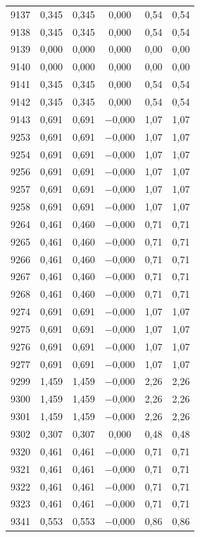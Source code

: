 \begin{longtable}{lccccc}
9137 & 0,345 & 0,345 & 0,000 & 0,54 & 0,54 \\
9138 & 0,345 & 0,345 & 0,000 & 0,54 & 0,54 \\
9139 & 0,000 & 0,000 & 0,000 & 0,00 & 0,00 \\
9140 & 0,000 & 0,000 & 0,000 & 0,00 & 0,00 \\
9141 & 0,345 & 0,345 & 0,000 & 0,54 & 0,54 \\
9142 & 0,345 & 0,345 & 0,000 & 0,54 & 0,54 \\
9143 & 0,691 & 0,691 & $-$0,000 & 1,07 & 1,07 \\
9253 & 0,691 & 0,691 & $-$0,000 & 1,07 & 1,07 \\
9254 & 0,691 & 0,691 & $-$0,000 & 1,07 & 1,07 \\
9256 & 0,691 & 0,691 & $-$0,000 & 1,07 & 1,07 \\
9257 & 0,691 & 0,691 & $-$0,000 & 1,07 & 1,07 \\
9258 & 0,691 & 0,691 & $-$0,000 & 1,07 & 1,07 \\
9264 & 0,461 & 0,460 & $-$0,000 & 0,71 & 0,71 \\
9265 & 0,461 & 0,460 & $-$0,000 & 0,71 & 0,71 \\
9266 & 0,461 & 0,460 & $-$0,000 & 0,71 & 0,71 \\
9267 & 0,461 & 0,460 & $-$0,000 & 0,71 & 0,71 \\
9268 & 0,461 & 0,460 & $-$0,000 & 0,71 & 0,71 \\
9274 & 0,691 & 0,691 & $-$0,000 & 1,07 & 1,07 \\
9275 & 0,691 & 0,691 & $-$0,000 & 1,07 & 1,07 \\
9276 & 0,691 & 0,691 & $-$0,000 & 1,07 & 1,07 \\
9277 & 0,691 & 0,691 & $-$0,000 & 1,07 & 1,07 \\
9299 & 1,459 & 1,459 & $-$0,000 & 2,26 & 2,26 \\
9300 & 1,459 & 1,459 & $-$0,000 & 2,26 & 2,26 \\
9301 & 1,459 & 1,459 & $-$0,000 & 2,26 & 2,26 \\
9302 & 0,307 & 0,307 & 0,000 & 0,48 & 0,48 \\
9320 & 0,461 & 0,461 & $-$0,000 & 0,71 & 0,71 \\
9321 & 0,461 & 0,461 & $-$0,000 & 0,71 & 0,71 \\
9322 & 0,461 & 0,461 & $-$0,000 & 0,71 & 0,71 \\
9323 & 0,461 & 0,461 & $-$0,000 & 0,71 & 0,71 \\
9341 & 0,553 & 0,553 & $-$0,000 & 0,86 & 0,86 \\

\end{longtable}
